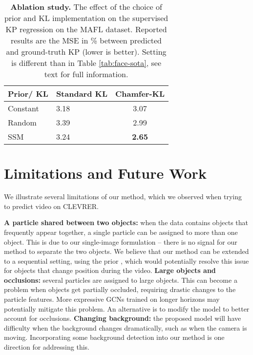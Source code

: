 \documentclass[nohyperref]{article}
\theoremstyle{plain}
\theoremstyle{definition}
\theoremstyle{remark}
\begin{document}
\begin{table}
\setlength{\tabcolsep}{4pt}
    \centering
    \begin{small}
    \begin{tabular}{@{}llc@{}}
    \toprule
    \multicolumn{1}{c}{Prior/ KL}                    & Standard KL  & Chamfer-KL        \\ \midrule
    Constant                  & 3.18         & 3.07                         \\
    Random                       & 3.39         & 2.99                         \\
    SSM                                              & 3.24         & \textbf{2.65}                          \\ \bottomrule
    \end{tabular}
    \end{small}
    \caption{{\bf Ablation study.} The effect of the choice of prior and KL implementation on the supervised KP regression on the MAFL dataset. Reported results are the MSE in \% between predicted and ground-truth KP (lower is better). Setting is different than in Table \ref{tab:face-sota}, see text for full information.}
    \label{tab:face-ablv}
    \vspace{-1em}
\end{table}

\section{Limitations and Future Work}
\label{sec:limits}
We illustrate several limitations of our method, which we observed when trying to predict video on CLEVRER.

\textbf{A particle shared between two objects:} when the data contains objects that frequently appear together, a single particle can be assigned to more than one object. This is due to our single-image formulation -- there is no signal for our method to separate the two objects. We believe that our method can be extended to a sequential setting, using the prior , which would potentially resolve this issue for objects that change position during the video. \textbf{Large objects and occlusions:} several particles are assigned to large objects. This can become a problem when objects get partially occluded, requiring drastic changes to the particle features. More expressive GCNs trained on longer horizons may potentially mitigate this problem. An alternative is to modify the model to better account for occlusions. \textbf{Changing background:} the proposed model will have difficulty when the background changes dramatically, such as when the camera is moving. Incorporating some background detection into our method is one direction for addressing this.
\end{document}
